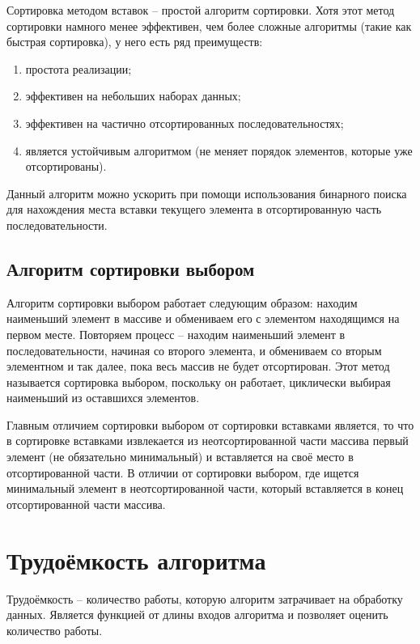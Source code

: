             Сортировка методом вставок -- простой алгоритм сортировки. 
            Хотя этот метод сортировки намного менее эффективен,
            чем более сложные алгоритмы (такие как быстрая сортировка), у него есть ряд преимуществ:
            \begin{enumerate}
                \item простота реализации;
                \item эффективен на небольших наборах данных;
                \item эффективен на частично отсортированных последовательностях;
                \item является устойчивым алгоритмом (не меняет порядок элементов, которые уже отсортированы).
            \end{enumerate}

            Данный алгоритм можно ускорить при помощи использования бинарного поиска для нахождения места
            вставки текущего элемента в отсортированную часть последовательности.

        \subsection{ Алгоритм сортировки выбором}
            Алгоритм сортировки выбором работает следующим образом: 
            находим наименьший элемент в массиве и обмениваем его с элементом находящимся на первом месте.
            Повторяем процесс -- находим наименьший элемент в последовательности, начиная со второго элемента, и
            обмениваем со вторым элементном и так далее, пока весь массив не будет отсортирован.
            Этот метод называется сортировка выбором, поскольку он работает, 
            циклически выбирая наименьший из оставшихся элементов.

            Главным отличием сортировки выбором от сортировки вставками является, то что в сортировке вставками 
            извлекается из неотсортированной части массива первый элемент (не обязательно минимальный) и
            вставляется на своё место в отсортированной части.
            В отличии от сортировки выбором, где ищется минимальный элемент 
            в неотсортированной части,  который вставляется в конец отсортированной части массива.


    \section{Трудоёмкость алгоритма}
        Трудоёмкость -- количество работы, которую алгоритм затрачивает на обработку данных.
        Является функцией от длины входов алгоритма и позволяет оценить количество работы.


